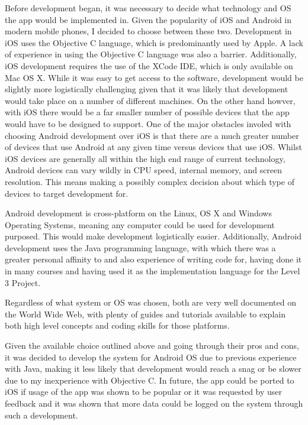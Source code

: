 \documentclass{l4proj}
\begin{document}
Before development began, it was necessary to decide what technology and OS the app would be implemented in. Given the popularity of iOS and Android in modern mobile phones, I decided to choose between these two. Development in iOS uses the Objective C language, which is predominantly used by Apple. A lack of experience in using the Objective C language was also a barrier. Additionally, iOS development requires the use of the XCode IDE, which is only available on Mac OS X.  While it was easy to get access to the software, development would be slightly more logistically challenging given that it was likely that development would take place on a number of different machines. On the other hand howver, with iOS there would be a far smaller number of possible devices that the app would have to be designed to support. One of the major obstacles involed with choosing Android development over iOS is that there are a much greater number of devices that use Android at any given time versus devices that use iOS. Whilst iOS devices are generally all within the high end range of current technology, Android devices can vary wildly in CPU speed, internal memory, and screen resolution. This means making a possibly complex decision about which type of devices to target development for.

Android development is cross-platform on the Linux, OS X and Windows Operating Systems, meaning any computer could be used for development purposed. This would make development logistically easier. Additionally, Android development uses the Java programming language, with which there was a greater personal affinity to and also experience of writing code for, having done it in many courses and having used it as the implementation language for the Level 3 Project. 

Regardless of what system or OS was chosen, both are very well documented on the World Wide Web, with plenty of guides and tutorials available to explain both high level concepts and coding skills for those platforms.

Given the available choice outlined above and going through their pros and cons, it was decided to develop the system for Android OS due to previous experience with Java, making it less likely that development would reach a snag or be slower due to my inexperience with Objective C. In future, the app could be ported to iOS if usage of the app was shown to be popular or it was requested by user feedback and it was shown that more data could be logged on the system through such a development.
\end{document}

